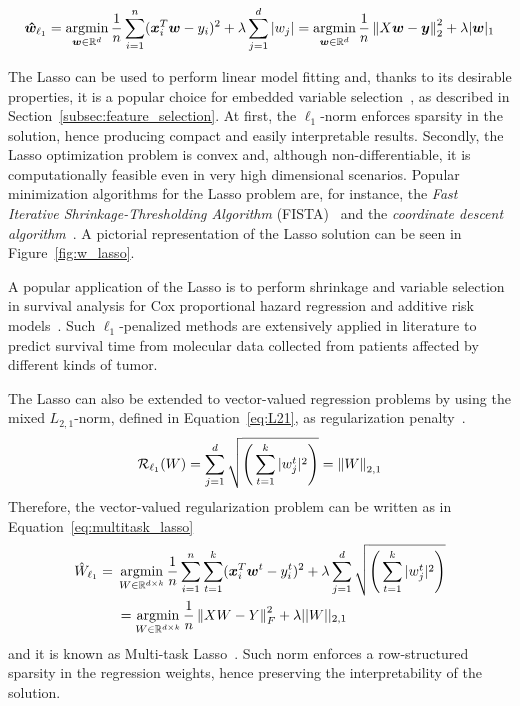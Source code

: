 			\begin{equation} \label{eq:lasso}
				\bm{\hat w}_{\ell_1} = \mathop{\mathrm{argmin}}\limits_{\bm{w} \in \mathbb{R}^d} \frac{1}{n} \sum_{i=1}^n (\bm{x}_i^T\bm{w} - y_i)^2 + \lambda  \sum_{j=1}^d |w_j| = \mathop{\mathrm{argmin}}\limits_{\bm{w} \in \mathbb{R}^d} \frac{1}{n} \left\lVert X\bm{w} - \bm{y}\right\rVert_2^2 + \lambda |\bm{w}|_1
			\end{equation}

			The Lasso can be used to perform linear model fitting and, thanks to its desirable properties, it is a popular choice for embedded variable selection~\cite{guyon2003introduction}, as described in Section~\ref{subsec:feature_selection}. At first, the $\ell_1$-norm enforces sparsity in the solution, hence producing compact and easily interpretable results. Secondly, the Lasso optimization problem is convex and, although non-differentiable, it is computationally feasible even in very high dimensional scenarios. Popular minimization algorithms for the Lasso problem are, for instance, the \textit{Fast Iterative Shrinkage-Thresholding Algorithm}  (\ac{FISTA})~\cite{beck2009fast} and the \textit{coordinate descent algorithm}~\cite{wu2008coordinate}. A pictorial representation of the Lasso solution can be seen in Figure~\ref{fig:w_lasso}.

			A popular application of the Lasso is to perform shrinkage and variable selection in survival analysis for Cox proportional hazard regression \cite{tang2017spike, gui2005penalized, tibshirani1997lasso} and additive risk models~\cite{ma2007additive}.
			Such $\ell_1$-penalized methods are extensively applied in literature to predict survival time from molecular data collected from patients affected by different kinds of tumor.

			The Lasso can also be extended to vector-valued regression problems by using the mixed $L_{2,1}$-norm, defined in Equation~\eqref{eq:L21}, as regularization penalty~\cite{gramfort2012mixed}.
			\begin{equation}\label{eq:L21}
				\mathcal{R}_{\ell_1}(W)= \sum_{j=1}^d\sqrt{\Bigg(\sum_{t=1}^k |w_j^t|^2\Bigg)} = \left\lVert W\right\rVert_{2,1}
			\end{equation}
			Therefore, the vector-valued regularization problem can be written as in Equation~\eqref{eq:multitask_lasso}
			\begin{equation} \label{eq:multitask_lasso}
				\begin{aligned}
					\hat W_{\ell_1}={} & \mathop{\mathrm{argmin}}\limits_{W \in \mathbb{R}^{d \times k}} \frac{1}{n} \sum_{i=1}^n \sum_{t=1}^k (\bm{x}_i^T\bm{w}^t - y_i^t)^2 + \lambda  \sum_{j=1}^d \sqrt{\Bigg(\sum_{t=1}^k |w_j^t|^2\Bigg)} \\
					& =	\mathop{\mathrm{argmin}}\limits_{W \in \mathbb{R}^{d \times k}} \frac{1}{n} \left\lVert XW - Y\right\rVert_F^2 + \lambda ||W||_{2,1}
				\end{aligned}
			\end{equation}
			and it is known as Multi-task Lasso~\cite{lee2010adaptive}. Such norm enforces a row-structured sparsity in the regression weights, hence preserving the interpretability of the solution.


